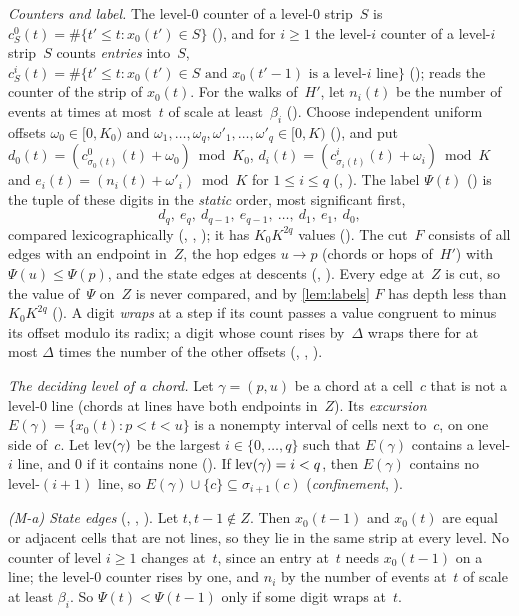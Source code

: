 \begin{outline}
\emph{Counters and label.} The level-$0$ counter of a level-$0$ strip~$S$ is $c^0_S(t)=\#\{t'\le t:x_0(t')\in S\}$
(), and for $i\ge1$ the level-$i$ counter of a level-$i$ strip~$S$ counts \emph{entries} into~$S$,
$c^i_S(t)=\#\{t'\le t:x_0(t')\in S\text{ and }x_0(t'-1)\text{ is a level-}i\text{ line}\}$ (); 
reads the counter of the strip of $x_0(t)$. For the walks of~$H'$, let $n_i(t)$ be the number of events at times at
most~$t$ of scale at least~$\beta_i$ (). Choose independent uniform offsets $\omega_0\in[0,K_0)$ and
$\omega_1,\dots,\omega_q,\omega'_1,\dots,\omega'_q\in[0,K)$ (), and put
$d_0(t)=(c^0_{\sigma_0(t)}(t)+\omega_0)\bmod K_0$, $d_i(t)=(c^i_{\sigma_i(t)}(t)+\omega_i)\bmod K$ and
$e_i(t)=(n_i(t)+\omega'_i)\bmod K$ for $1\le i\le q$ (, ). The label $\Psi(t)$ () is the
tuple of these digits in the \emph{static} order, most significant first,
\[
  d_q,\ e_q,\ d_{q-1},\ e_{q-1},\ \dots,\ d_1,\ e_1,\ d_0,
\]
compared lexicographically (, , ); it has $K_0K^{2q}$ values (). The
cut~$F$ consists of all edges with an endpoint in~$Z$, the hop edges $u\to p$ (chords or hops of~$H'$) with
$\Psi(u)\le\Psi(p)$, and the state edges at descents (, ). Every edge at~$Z$ is cut, so the value
of~$\Psi$ on~$Z$ is never compared, and by \cref{lem:labels} $F$ has depth less than $K_0K^{2q}$
(). A digit \emph{wraps} at a step if its count passes a value congruent to minus its offset
modulo its radix; a digit whose count rises by~$\Delta$ wraps there for at most $\Delta$ times the number of the other
offsets (, , ).

\emph{The deciding level of a chord.} Let $\gamma=(p,u)$ be a chord at a cell~$c$ that is not a level-$0$ line (chords at
lines have both endpoints in~$Z$). Its \emph{excursion} $E(\gamma)=\{x_0(t):p<t<u\}$ is a nonempty interval of cells next
to~$c$, on one side of~$c$. Let $\mathrm{lev}(\gamma)$ be the largest $i\in\{0,\dots,q\}$ such that $E(\gamma)$ contains a level-$i$
line, and $0$ if it contains none (). If $\mathrm{lev}(\gamma)=i<q$, then $E(\gamma)$ contains no level-$(i+1)$
line, so $E(\gamma)\cup\{c\}\subseteq\sigma_{i+1}(c)$ (\emph{confinement}, ).

\emph{(M-a) State edges} (, , ). Let $t,t-1\notin Z$. Then
$x_0(t-1)$ and $x_0(t)$ are equal or adjacent cells that are not lines, so they lie in the same strip at every level. No
counter of level $i\ge1$ changes at~$t$, since an entry at~$t$ needs $x_0(t-1)$ on a line; the level-$0$ counter rises by
one, and $n_i$ by the number of events at~$t$ of scale at least $\beta_i$. So $\Psi(t)<\Psi(t-1)$ only if some digit wraps
at~$t$.


\end{outline}
